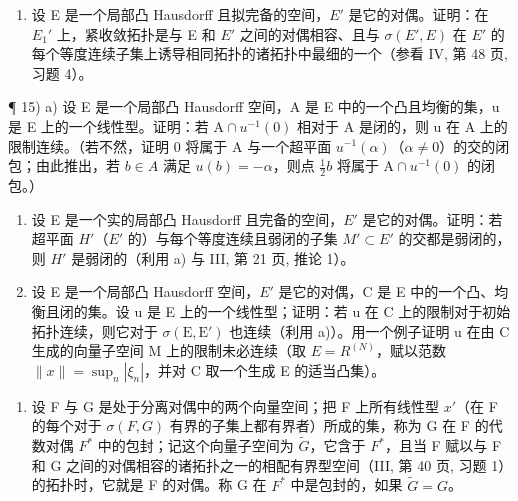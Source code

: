\begin{enumerate}
\def\labelenumi{\arabic{enumi})}
\setcounter{enumi}{13}
\tightlist
\item
  设 E 是一个局部凸 Hausdorff 且拟完备的空间，\(E'\) 是它的对偶。证明：在 \(E_{1}'\) 上，紧收敛拓扑是与 E 和 \(E'\) 之间的对偶相容、且与 \(\sigma(E', E)\) 在 \(E'\) 的每个等度连续子集上诱导相同拓扑的诸拓扑中最细的一个（参看 IV, 第 48 页, 习题 4）。
\end{enumerate}

¶ 15) a) 设 E 是一个局部凸 Hausdorff 空间，A 是 E 中的一个凸且均衡的集，u 是 E 上的一个线性型。证明：若 \(\mathrm{A} \cap u^{-1}(0)\) 相对于 A 是闭的，则 u 在 A 上的限制连续。（若不然，证明 0 将属于 A 与一个超平面 \(u^{-1}(\alpha)\)（\(\alpha \neq 0\)）的交的闭包；由此推出，若 \(b \in A\) 满足 \(u(b) = -\alpha\)，则点 \(\frac{1}{2}b\) 将属于 \(\mathrm{A} \cap u^{-1}(0)\) 的闭包。）

\begin{enumerate}
\def\labelenumi{\alph{enumi})}
\setcounter{enumi}{1}
\item
  设 E 是一个实的局部凸 Hausdorff 且完备的空间，\(E'\) 是它的对偶。证明：若超平面 \(H'\)（\(E'\) 的）与每个等度连续且弱闭的子集 \(M' \subset E'\) 的交都是弱闭的，则 \(H'\) 是弱闭的（利用 a) 与 III, 第 21 页, 推论 1）。
\item
  设 E 是一个局部凸 Hausdorff 空间，\(E'\) 是它的对偶，C 是 E 中的一个凸、均衡且闭的集。设 u 是 E 上的一个线性型；证明：若 u 在 C 上的限制对于初始拓扑连续，则它对于 \(\sigma(\mathrm{E}, \mathrm{E}')\) 也连续（利用 a)）。用一个例子证明 u 在由 C 生成的向量子空间 M 上的限制未必连续（取 \(E = R^{(N)}\)，赋以范数 \(\|x\| = \sup_{n} |\xi_{n}|\)，并对 C 取一个生成 E 的适当凸集）。
\end{enumerate}

\begin{enumerate}
\def\labelenumi{\arabic{enumi})}
\setcounter{enumi}{15}
\tightlist
\item
  设 F 与 G 是处于分离对偶中的两个向量空间；把 F 上所有线性型 \(x'\)（在 F 的每个对于 \(\sigma(F, G)\) 有界的子集上都有界者）所成的集，称为 G 在 F 的代数对偶 \(F^{*}\) 中的包封；记这个向量子空间为 \(\tilde{G}\)，它含于 \(F^{*}\)，且当 F 赋以与 F 和 G 之间的对偶相容的诸拓扑之一的相配有界型空间（III, 第 40 页, 习题 1）的拓扑时，它就是 F 的对偶。称 G 在 \(F^{*}\) 中是包封的，如果 \(\tilde{G} = G\)。
\end{enumerate}

